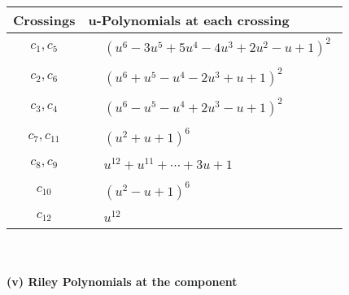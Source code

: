 \documentclass[1p]{elsarticle_modified}
\theoremstyle{definition}
\begin{document}
\begin{tabular}{m{50pt}|m{274pt}}
Crossings & \hspace{64pt}u-Polynomials at each crossing \\
\hline $$\begin{aligned}c_{1},c_{5}\end{aligned}$$&$\begin{aligned}
&(u^6-3 u^5+5 u^4-4 u^3+2 u^2- u+1)^2
\end{aligned}$\\
\hline $$\begin{aligned}c_{2},c_{6}\end{aligned}$$&$\begin{aligned}
&(u^6+u^5- u^4-2 u^3+u+1)^2
\end{aligned}$\\
\hline $$\begin{aligned}c_{3},c_{4}\end{aligned}$$&$\begin{aligned}
&(u^6- u^5- u^4+2 u^3- u+1)^2
\end{aligned}$\\
\hline $$\begin{aligned}c_{7},c_{11}\end{aligned}$$&$\begin{aligned}
&(u^2+u+1)^6
\end{aligned}$\\
\hline $$\begin{aligned}c_{8},c_{9}\end{aligned}$$&$\begin{aligned}
&u^{12}+u^{11}+\cdots+3 u+1
\end{aligned}$\\
\hline $$\begin{aligned}c_{10}\end{aligned}$$&$\begin{aligned}
&(u^2- u+1)^6
\end{aligned}$\\
\hline $$\begin{aligned}c_{12}\end{aligned}$$&$\begin{aligned}
&u^{12}
\end{aligned}$\\
\hline
\end{tabular}\\~\\
\newpage\renewcommand{\arraystretch}{1}
\flushleft \textbf{(v) Riley Polynomials at the component}\newline \\
\end{document}
